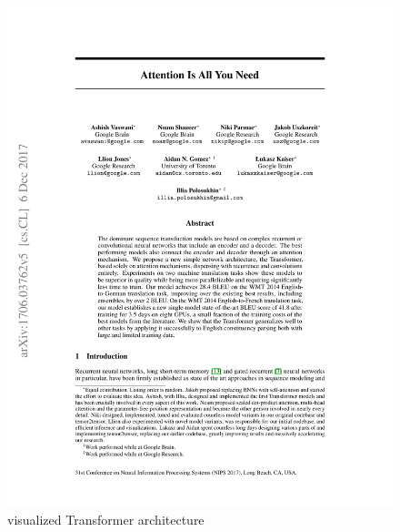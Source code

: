 \documentclass[draft,final]{vutinfth} %
\begin{document}
    \begin{figure}[H]
        \centering{}
        \includegraphics[page=3,width=0.6\linewidth,trim={196 398 196 71},clip]{literature/attention_is_all_you_need.pdf}
        \caption{visualized Transformer architecture \cite[p. 3]{Transformer}}
        \label{fig:transformer_vis}
    \end{figure}
\end{document}
